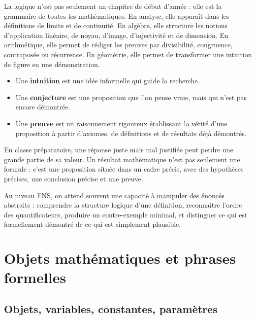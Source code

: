 \documentclass[11pt,a4paper]{article}
\begin{document}
La logique n'est pas seulement un chapitre de début d'année : elle est la grammaire de toutes les mathématiques. En analyse, elle apparaît dans les définitions de limite et de continuité. En algèbre, elle structure les notions d'application linéaire, de noyau, d'image, d'injectivité et de dimension. En arithmétique, elle permet de rédiger les preuves par divisibilité, congruence, contraposée ou récurrence. En géométrie, elle permet de transformer une intuition de figure en une démonstration.

\begin{definitionbox}
\begin{itemize}
    \item Une \textbf{intuition} est une idée informelle qui guide la recherche.
    \item Une \textbf{conjecture} est une proposition que l'on pense vraie, mais qui n'est pas encore démontrée.
    \item Une \textbf{preuve} est un raisonnement rigoureux établissant la vérité d'une proposition à partir d'axiomes, de définitions et de résultats déjà démontrés.
\end{itemize}
\end{definitionbox}

\begin{retenirbox}
En classe préparatoire, une réponse juste mais mal justifiée peut perdre une grande partie de sa valeur. Un résultat mathématique n'est pas seulement une formule : c'est une proposition située dans un cadre précis, avec des hypothèses précises, une conclusion précise et une preuve.
\end{retenirbox}

\begin{ensbox}
Au niveau ENS, on attend souvent une capacité à manipuler des énoncés abstraits : comprendre la structure logique d'une définition, reconnaître l'ordre des quantificateurs, produire un contre-exemple minimal, et distinguer ce qui est formellement démontré de ce qui est simplement plausible.
\end{ensbox}

\section{Objets mathématiques et phrases formelles}

\subsection{Objets, variables, constantes, paramètres}
\end{document}
